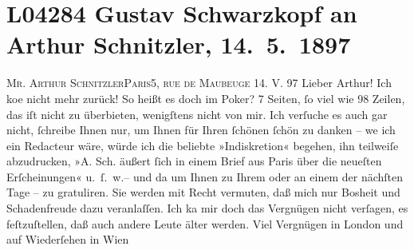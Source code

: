 

\section[Gustav Schwarzkopf an Arthur Schnitzler, 14. 5. 1897]{L04284 Gustav Schwarzkopf an Arthur Schnitzler, 14. 5. 1897}
\nopagebreak{}
\rehead{ }\normalsize\beginnumbering{}
\toendnotes[C]{\smallbreak\pagebreak[2]}
\toendnotes[C]{\smallbreak}
\toendnotes[C]{\smallbreak}\pstart{}{\pb}\textsc{Mr. Arthur Schnitzler}\pend{}\pstart{}\textsc{Paris}\pend{}\pstart{}\textsc{5, rue de Maubeuge}\pend{}{\bigskip}\vspace{1em}
\pstart
           \raggedleft{}{\pb}14. V. 97\pend
           \vspace{0.5em}
\pstart
           Lieber Arthur! Ich ko{\geminationm}e nicht mehr
               zurück! So heißt es doch im Poker? 7 Seiten,{ }ſo viel wie 98 Zeilen, das iſt nicht zu
               überbieten, wenigſtens nicht von mir. Ich verſuche es auch gar nicht,{ }ſchreibe Ihnen
               nur, um Ihnen für Ihren{ }ſchönen \label{K_L04284-1v}\label{K_L04284-1}{ }ſchön zu danken – we{\geminationn} ich ein Redacteur wäre, würde ich die beliebte
               »Indiskretion« begehen, ihn teilweiſe abzudrucken, »A. Sch. äußert{ }ſich in einem
               Brief aus Paris über die neueſten Erſcheinungen«
               u. ſ. w.– und da{\geminationn} um Ihnen zu Ihrem \label{K_L04284-2v}\label{K_L04284-2} oder an einem der nächſten Tage – zu gratuliren. Sie werden mit Recht
               vermuten, daß mich nur Bosheit und Schadenfreude dazu veranlaſſen. Ich ka{\geminationn} mir doch das Vergnügen nicht verſagen, es
               feſtzuſtellen, daß auch andere Leute älter werden. Viel Vergnügen in London und auf Wiederſehen in Wien\pend
           
